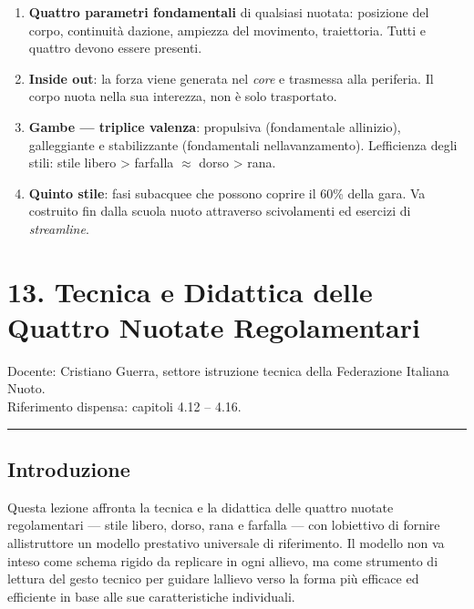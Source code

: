 \documentclass[a4paper,11pt]{article}
\begin{document}
\begin{enumerate}
            \textbf{Forma vs. contenuto}: trasmettere contenuti ("aggancia, tira,
            spingi"), non forme estetiche. I contenuti generano forma
            personalizzata; la forma senza contenuto è solo coreografia.
      \item
            \textbf{Quattro parametri fondamentali} di qualsiasi nuotata:
            posizione del corpo, continuità d\textquotesingle azione, ampiezza del
            movimento, traiettoria. Tutti e quattro devono essere presenti.
      \item
            \textbf{Inside out}: la forza viene generata nel \emph{core} e
            trasmessa alla periferia. Il corpo nuota nella sua interezza, non è
            solo trasportato.
      \item
            \textbf{Gambe --- triplice valenza}: propulsiva (fondamentale
            all\textquotesingle inizio), galleggiante e stabilizzante
            (fondamentali nell\textquotesingle avanzamento).
            L\textquotesingle efficienza degli stili: stile libero \textgreater{}
            farfalla $\approx$ dorso \textgreater{} rana.
      \item
            \textbf{Quinto stile}: fasi subacquee che possono coprire il 60\%
            della gara. Va costruito fin dalla scuola nuoto attraverso
            scivolamenti ed esercizi di \emph{streamline}.
\end{enumerate}

\section{13. Tecnica e Didattica delle Quattro Nuotate
  Regolamentari}\label{tecnica-e-didattica-delle-quattro-nuotate-regolamentari}

Docente: Cristiano Guerra, settore istruzione tecnica della Federazione
Italiana Nuoto.\\
Riferimento dispensa: capitoli 4.12 -- 4.16.

\begin{center}\rule{0.5\linewidth}{0.5pt}\end{center}

\subsection{Introduzione}\label{introduzione-12}

Questa lezione affronta la tecnica e la didattica delle quattro nuotate
regolamentari --- stile libero, dorso, rana e farfalla --- con
l\textquotesingle obiettivo di fornire all\textquotesingle istruttore un
modello prestativo universale di riferimento. Il modello non va inteso
come schema rigido da replicare in ogni allievo, ma come strumento di
lettura del gesto tecnico per guidare l\textquotesingle allievo verso la
forma più efficace ed efficiente in base alle sue caratteristiche
individuali.
\end{document}
